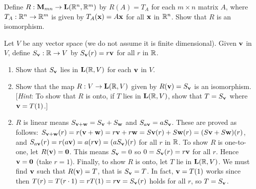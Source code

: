 \begin{multicols}{1}
\begin{ex}
\begin{sol}
\begin{enumerate}[label={\alph*.}]
\end{enumerate}
\end{sol}
\end{ex}

\begin{ex}
Define $R : \textbf{M}_{mn} \to \textbf{L}(\mathbb{R}^n, \mathbb{R}^m)$ by $R(A) = T_{A}$ for each $m \times n$ matrix $A$, where $T_{A} : \mathbb{R}^n \to \mathbb{R}^m$ is given by $T_{A}(\textbf{x}) = A\textbf{x}$ for all $\textbf{x}$ in $\mathbb{R}^n$. Show that $R$ is an isomorphism.
\end{ex}

\begin{ex}
Let $V$ be any vector space (we do not assume it is finite dimensional). Given $\textbf{v}$ in $V$, define $S_{\textbf{v}} : \mathbb{R} \to V$ by $S_{\textbf{v}}(r) = r\textbf{v}$ for all $r$ in $\mathbb{R}$.


\begin{enumerate}[label={\alph*.}]
\item Show that $S_{\textbf{v}}$ lies in $\textbf{L}(\mathbb{R}, V)$ for each $\textbf{v}$ in $V$.

\item Show that the map $R : V \to \textbf{L}(\mathbb{R}, V)$ given by $R(\textbf{v}) = S_{\textbf{v}}$ is an isomorphism. [\textit{Hint}: To show that $R$ is onto, if $T$ lies in $\textbf{L}(\mathbb{R}, V)$, show that $T = S_{\textbf{v}}$ where $\textbf{v} = T(1)$.]

\end{enumerate}
\begin{sol}
\begin{enumerate}[label={\alph*.}]
\setcounter{enumi}{1}
\item $R$ is linear means $S_{\textbf{v}+\textbf{w}} = S_{\textbf{v}} + S_{\textbf{w}}$ and $S_{a\textbf{v}} = aS_{\textbf{v}}$. These are proved as follows: $S_{\textbf{v}+\textbf{w}}(r) = r(\textbf{v} + \textbf{w}) = r\textbf{v} + r\textbf{w} = S\textbf{v}(r) + S\textbf{w}(r) = (S\textbf{v} + S\textbf{w})(r)$, and $S_{a\textbf{v}}(r) = r(a\textbf{v}) = a(r\textbf{v}) = (aS_{\textbf{v}})(r)$ for all $r$ in $\mathbb{R}$. To show $R$ is one-to-one, let $R(\textbf{v}) = \textbf{0}$. This means $S_{\textbf{v}} = 0$ so $0 = S_{\textbf{v}}(r) = r\textbf{v}$ for all $r$. Hence $\textbf{v} = \textbf{0}$ (take $r = 1$). Finally, to show $R$ is onto, let $T$ lie in $\textbf{L}(\mathbb{R}, V)$. We must find $\textbf{v}$ such that $R(\textbf{v}) = T$, that is $S_{\textbf{v}} = T$. In fact, $\textbf{v} = T(1)$ works since then $T(r) = T(r \cdot 1) = rT(1) = r\textbf{v} = S_{\textbf{v}}(r)$ holds for all $r$, so $T = S_{\textbf{v}}$.

\end{enumerate}
\end{sol}
\end{ex}


\end{multicols}
